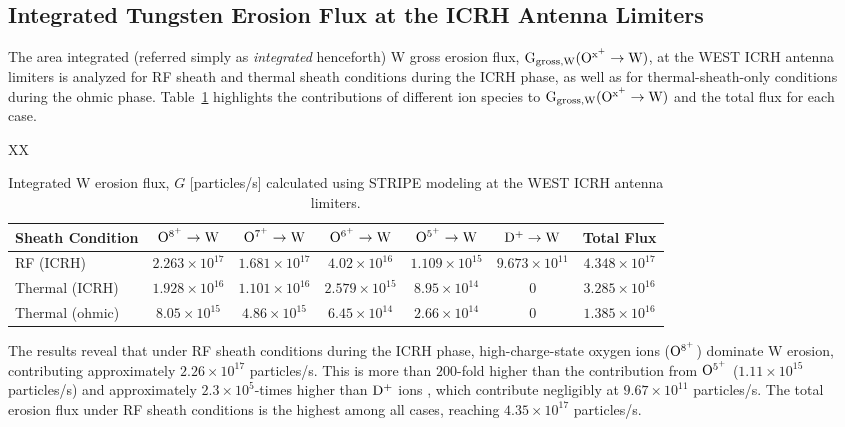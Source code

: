 \documentclass[10pt]{iopart}
\begin{document}
\subsection{Integrated Tungsten Erosion Flux at the ICRH Antenna Limiters}

The area integrated (referred simply as {\textit{integrated}} henceforth) W gross erosion flux, $\rm G_{{gross, W}} (O^{x^+}\rightarrow W)$, at the WEST ICRH antenna limiters is analyzed for RF sheath and thermal sheath conditions during the ICRH phase, as well as for thermal-sheath-only conditions during the ohmic phase. Table~\ref{tab:table1} highlights the contributions of different ion species to $\rm G_{{gross, W}} (O^{x^+}\rightarrow W)$ and the total flux for each case.

\begin{table}
\caption{\label{tab:table1} Integrated W erosion flux, $G$ [particles/s] calculated using STRIPE modeling at the WEST ICRH antenna limiters.}

\begin{tabularx}{\textwidth}{XX}

\begin{tabular}{lcccccc}
\hline \hline
Sheath Condition & $\rm O^{8^+}\rightarrow W$ & $\rm O^{7^+}\rightarrow W$ & $\rm O^{6^+}\rightarrow W$ & $\rm O^{5^+}\rightarrow W$ & $\rm D^+\rightarrow W$ & Total Flux \\
\hline
RF  (ICRH) & $2.263 \times 10^{17}$ & $1.681 \times 10^{17}$ & $4.02 \times 10^{16}$ & $1.109 \times 10^{15}$ & $9.673 \times 10^{11}$ & $4.348 \times 10^{17}$ \\
Thermal (ICRH) & $1.928 \times 10^{16}$ & $1.101 \times 10^{16}$ & $2.579 \times 10^{15}$ & $8.95 \times 10^{14}$ & 0 & $3.285 \times 10^{16}$ \\
Thermal  (ohmic) & $8.05 \times 10^{15}$ & $4.86 \times 10^{15}$ & $6.45 \times 10^{14}$ & $2.66 \times 10^{14}$ & $0$ & $1.385 \times 10^{16}$ \\
\hline
\end{tabular}
\end{tabularx}
\end{table}

The results reveal that under RF sheath conditions during the ICRH phase, high-charge-state oxygen ions (\(\rm O^{8^+}\)) dominate W erosion, contributing approximately \(2.26 \times 10^{17}\) particles/s. This is more than \(200\)-fold higher than the contribution from \(\rm O^{5^+}\) (\(1.11 \times 10^{15}\) particles/s) and approximately \(2.3 \times 10^5\)-times higher than $\rm D^+$ ions , which contribute negligibly at \(9.67 \times 10^{11}\) particles/s. The total erosion flux under RF sheath conditions is the highest among all cases, reaching \(4.35 \times 10^{17}\) particles/s.
\end{document}
